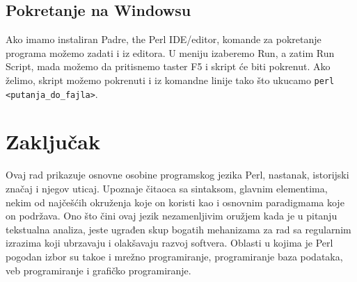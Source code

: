 \documentclass[a4paper]{article}
\begin{document}
\subsection{Pokretanje na Windowsu}
Ako imamo instaliran Padre, the Perl IDE/editor, komande za pokretanje programa možemo zadati i iz editora. U meniju izaberemo Run, a zatim Run Script, mada možemo da pritisnemo taster F5 i skript \'ce biti pokrenut.
Ako želimo, skript možemo pokrenuti i iz komandne linije tako što ukucamo {\lstinline!perl <putanja_do_fajla>!}.



\newpage
\section{Zaključak}
\label{sec:zakljucak}

Ovaj rad prikazuje osnovne osobine programskog jezika Perl, nastanak, istorijski značaj i njegov uticaj. Upoznaje \v citaoca sa sintaksom, glavnim elementima, nekim od naj\v ce\v s\'cih okru\v zenja koje on koristi kao i osnovnim paradigmama koje on podržava. Ono što čini ovaj jezik nezamenljivim oružjem kada je u pitanju tekstualna analiza, jeste ugrađen skup bogatih mehanizama za rad sa regularnim izrazima koji ubrzavaju i olakšavaju razvoj softvera. Oblasti u kojima je Perl pogodan izbor su tako\dj{}e i mrežno programiranje, programiranje baza podataka, veb programiranje i grafičko programiranje. 


\appendix
 

\end{document}

